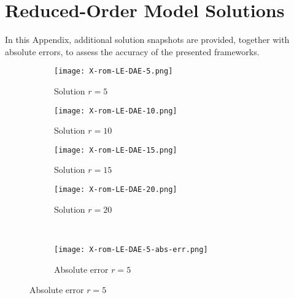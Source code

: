 \section{Reduced-Order Model Solutions}
In this Appendix, additional solution snapshots are provided, together with absolute errors, to assess the accuracy of the presented frameworks.
\begin{figure}[!htb]
     \begin{center}
        \begin{subfigure}[b]{0.23\textwidth}
            \begin{center}
                \texttt{[image: X-rom-LE-DAE-5.png]}
            \end{center}
            \caption{Solution $r = 5$}
        \end{subfigure}
   \begin{subfigure}[b]{0.23\textwidth}
            \begin{center}
                \texttt{[image: X-rom-LE-DAE-10.png]}
            \end{center}
            \caption{Solution $r = 10$}
        \end{subfigure}
   \begin{subfigure}[b]{0.23\textwidth}
            \begin{center}
                \texttt{[image: X-rom-LE-DAE-15.png]}
            \end{center}
            \caption{Solution $r = 15$}
        \end{subfigure}
   \begin{subfigure}[b]{0.23\textwidth}
            \begin{center}
                \texttt{[image: X-rom-LE-DAE-20.png]}
            \end{center}
            \caption{Solution $r = 20$}
        \end{subfigure}\\  
        \begin{subfigure}[b]{0.23\textwidth}
            \begin{center}
                \texttt{[image: X-rom-LE-DAE-5-abs-err.png]}
            \end{center}
            \caption{Absolute error $r = 5$}
        \end{subfigure}  

\end{center}
\end{figure}
